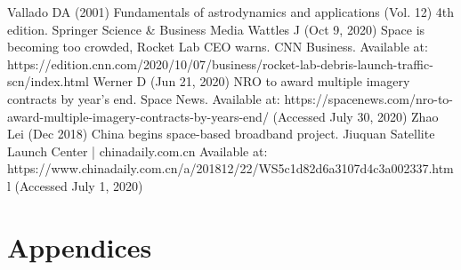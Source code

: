 \documentclass[12pt,a4paper,notitlepage,twoside,openright]{report}
\begin{document}
\begin{thebibliography}{100}
 Vallado DA (2001) Fundamentals of astrodynamics and applications (Vol. 12) 4th edition. Springer Science \& Business Media
 Wattles J (Oct 9, 2020) Space is becoming too crowded, Rocket Lab CEO warns. CNN Business. Available at: https://edition.cnn.com/2020/10/07/business/rocket-lab-debris-launch-traffic-scn/index.html
 Werner D (Jun 21, 2020) NRO to award multiple imagery contracts by year’s end. Space News. Available at: https://spacenews.com/nro-to-award-multiple-imagery-contracts-by-years-end/ (Accessed July 30, 2020)
 Zhao Lei (Dec 2018) China begins space-based broadband project. Jiuquan Satellite Launch Center | chinadaily.com.cn Available at: https://www.chinadaily.com.cn/a/201812/22/WS5c1d82d6a3107d4c3a002337.html (Accessed July 1, 2020)




\end{thebibliography}


\newpage
\chapter*{Appendices}
\label{app}
\end{document}

